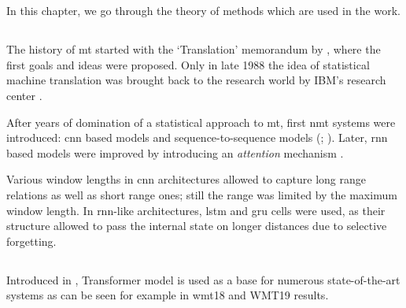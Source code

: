 \chapter{}

In this chapter, we go through the theory of methods which are used in the work.

\section{}

The history of \acrfull{mt} started with the `Translation' memorandum
by \citet{Weaver1955}, where the first goals and ideas were proposed.
Only in late 1988 the idea of statistical machine translation was 
brought back to the research world by IBM's research center \citet{stat-mt}.

After years of domination of a statistical approach to \acrshort{mt},
first \acrfull{nmt} systems were introduced:
\acrfull{cnn} based models \citep{kalchbrenner-blunsom-2013-recurrent} and
sequence-to-sequence models (; ).
Later, \acrfull{rnn} based models were improved by introducing an
\emph{attention} mechanism \citep{Bahdanau2014-attention}.

Various window lengths in \acrshort{cnn} architectures allowed to capture
long range relations as well as short range ones;
still the range was limited by the maximum window length.
In \acrshort{rnn}-like architectures, \acrfull{lstm} and \acrfull{gru} cells
were used, as their structure allowed to pass the internal state
on longer distances due to selective forgetting.

\section{}

Introduced in , Transformer model is used as a base
for numerous state-of-the-art systems as can be seen for example in 
\acrshort{wmt}18  and
WMT19  results.

